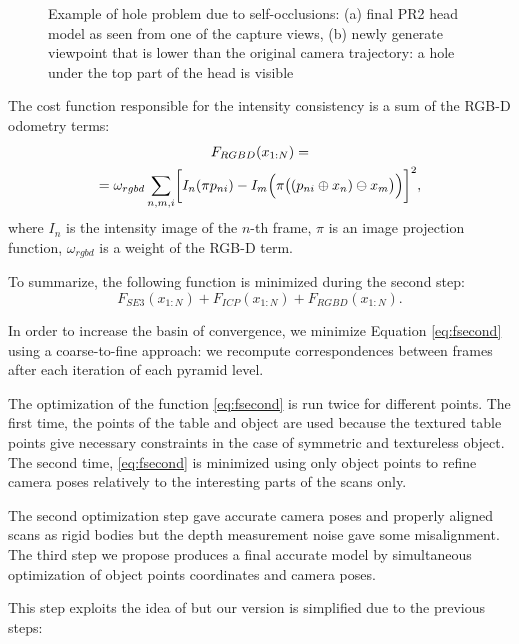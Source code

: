 \documentclass[letterpaper, 10 pt, conference]{ieeeconf}  %
\begin{document}
\begin{figure}[t]
\begin{subfigure}[b]{0.45\linewidth}
                \caption{}
        \end{subfigure}
        \caption{Example of hole problem due to self-occlusions:
        (a) final PR2 head model as seen from one of the capture views,
        (b) newly generate viewpoint that is lower than the original camera trajectory: a hole under 
        the top part of the head is visible}
        \label{fig:pr2}
\end{figure}

The cost function responsible for the intensity consistency is
a sum of the RGB-D odometry terms:
\begin{multline} \label{eq:frgbd}
F_{RGBD}(x_{1:N}) = \\
= \omega_{rgbd} \sum_{n,m,i} \biggl[I_n(\pi p_{ni}) - I_m\Bigl(\pi \bigl((p_{ni} \oplus x_n) \ominus x_m\bigr)\Bigr) \biggr]^2,
\end{multline}
where $I_n$ is the intensity image of the $n$-th frame, $\pi$ is an image projection function, $\omega_{rgbd}$
is a weight of the RGB-D term.

To summarize, the following function is minimized during the second step:
\begin{equation} \label{eq:fsecond}
F_{SE3}(x_{1:N}) + F_{ICP}(x_{1:N}) + F_{RGBD}(x_{1:N}).
\end{equation}

In order to increase the basin of convergence,
we minimize Equation \eqref{eq:fsecond} using a coarse-to-fine approach:
we recompute correspondences between frames
after each iteration of each pyramid level.

The optimization of the function \eqref{eq:fsecond} is run 
twice for different points. The first time, the points of the table and object are used because 
the textured table points give necessary constraints in the case of symmetric and textureless object.
The second time, \eqref{eq:fsecond} is minimized using only object points to refine 
camera poses relatively to the interesting parts of the scans only.

The second optimization step gave accurate camera poses and properly aligned scans
as rigid bodies but the depth measurement noise gave some misalignment. The third step we propose produces a 
final accurate model by
simultaneous optimization of object points coordinates and camera poses.

This step exploits the idea of \cite{ruhnke2012highly} but our version 
is simplified due to the previous steps: 
\end{document}
